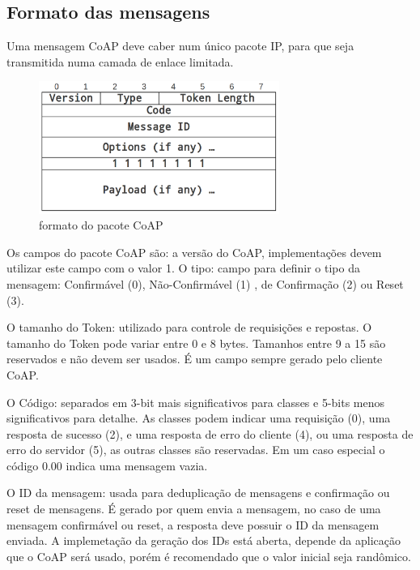 \subsection{Formato das mensagens}
Uma mensagem CoAP deve caber num \'unico pacote IP, para que seja transmitida numa camada de enlace limitada.
\begin{figure}[h]
    \label{coapFormat}
    \centering
    \includegraphics[width=0.7\textwidth]{figuras/formato.png}
    \caption{formato do pacote CoAP  \cite{draft-ietf-core-coap-18}}
\end{figure}


Os campos do pacote CoAP s\~ao: a vers\~ao do CoAP, implementa\c{c}\~oes devem utilizar este campo com o valor 1. O tipo: campo para definir o tipo da mensagem: Confirm\'avel (0), N\~ao-Confirm\'avel (1) , de Confirma\c{c}\~ao (2) ou Reset (3).

O tamanho do Token: utilizado para controle de requisi\c{c}\~oes e repostas. O tamanho do Token pode variar entre 0 e 8 bytes. Tamanhos entre 9 a 15 s\~ao reservados e n\~ao devem ser usados. \'E um campo sempre gerado pelo cliente CoAP.

O C\'odigo: separados em 3-bit mais significativos para classes e 5-bits menos significativos para detalhe. As classes podem indicar uma requisi\c{c}\~ao (0), uma resposta de sucesso (2), e uma resposta de erro do cliente (4), ou uma resposta de erro do servidor (5), as outras classes s\~ao reservadas. Em um caso especial o c\'odigo 0.00 indica uma mensagem vazia.

O ID da mensagem: usada para deduplica\c{c}\~ao de mensagens e confirma\c{c}\~ao ou reset de mensagens. \'E gerado por quem envia a mensagem, no caso de uma mensagem confirm\'avel ou reset, a resposta deve possuir o ID da mensagem enviada. A implemeta\c{c}\~ao da gera\c{c}\~ao dos IDs est\'a aberta, depende da aplica\c{c}\~ao que o CoAP ser\'a usado, por\'em \'e recomendado que o valor inicial seja rand\^omico.
   

